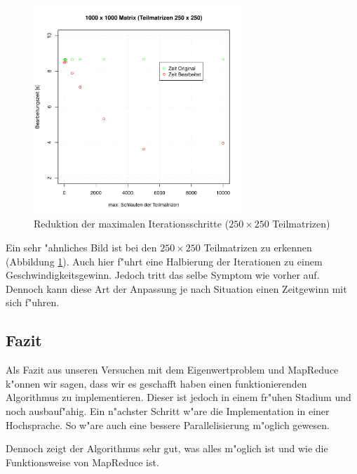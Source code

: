 \begin{refsection}
\begin{figure}
\begin{center}
\includegraphics[width=0.7\textwidth]{./mapreduce/PC1000spec250.pdf}
\end{center}
\caption{Reduktion der maximalen Iterationsschritte ($250\times250$ Teilmatrizen)}
\label{ww}
\end{figure}

Ein sehr "ahnliches Bild ist bei den $250\times250$ Teilmatrizen zu
erkennen (Abbildung \ref{ww}). Auch hier f"uhrt eine Halbierung der
Iterationen zu einem Geschwindigkeitsgewinn. Jedoch tritt das selbe
Symptom wie vorher auf. Dennoch kann diese Art der Anpassung je nach
Situation einen Zeitgewinn mit sich f"uhren.

\subsection{Fazit}
Als Fazit aus unseren Versuchen mit dem Eigenwertproblem und MapReduce
k"onnen wir sagen, dass wir es geschafft haben einen funktionierenden
Algorithmus zu implementieren. Dieser ist jedoch in einem fr"uhen
Stadium und noch ausbauf"ahig. Ein n"achster Schritt w"are die
Implementation in einer Hochsprache. So w"are auch eine bessere
Parallelisierung m"oglich gewesen.

Dennoch zeigt der Algorithmus sehr gut, was alles m"oglich ist und wie
die Funktionsweise von MapReduce ist.

\printbibliography[heading=subbibliography]
\end{refsection}

